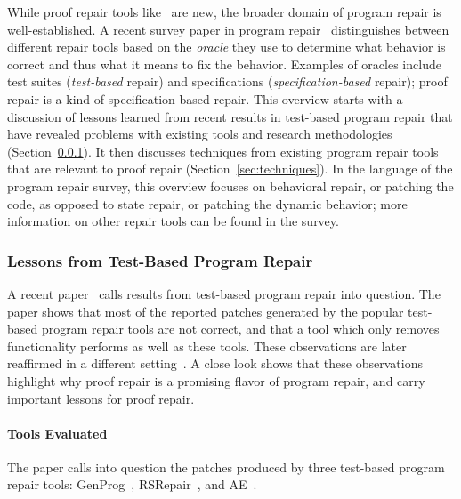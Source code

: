 While proof repair tools like \sysname\ are new, the broader domain of program repair is well-established.
A recent survey paper in program repair~\cite{Monperrus:2018:ASR:3177787.3105906} distinguishes between different repair tools
based on the \textit{oracle} they use to determine what behavior is correct and thus what it means to fix the behavior. 
Examples of oracles include test suites (\textit{test-based} repair) and specifications (\textit{specification-based} repair);
proof repair is a kind of specification-based repair.
This overview starts with a discussion of lessons learned from recent results in test-based program repair that have revealed
problems with existing tools and research methodologies (Section~\ref{sec:lessons}). It then discusses
techniques from existing program repair tools that are relevant to proof repair (Section~\ref{sec:techniques}). 
In the language of the program repair survey, %
this overview focuses on behavioral repair, or patching the code, as opposed to state repair, or patching the dynamic behavior;
more information on other repair tools %
can be found in the survey.

\subsubsection{Lessons from Test-Based Program Repair}
\label{sec:lessons}

A recent paper~\cite{Qi:2015:APP:2771783.2771791} calls results from test-based program repair into
question. The paper shows that most of the reported patches generated by the popular test-based program repair tools
are not correct, and that a tool which only removes functionality
performs as well %
as these tools. These observations %
are later reaffirmed in a different setting~\cite{DBLP:journals/corr/abs-1811-02429}.
A close look shows that these observations highlight why proof repair
is a promising flavor of program repair, and carry important lessons
for proof repair.

\paragraph{Tools Evaluated}
The paper calls into question
the patches produced by three test-based program repair tools:
GenProg~\cite{LeGoues:2012:SSA:2337223.2337225}, RSRepair~\cite{Qi:2014:SRS:2568225.2568254}, and AE~\cite{Weimer:2013:LPE:3107656.3107702}.

